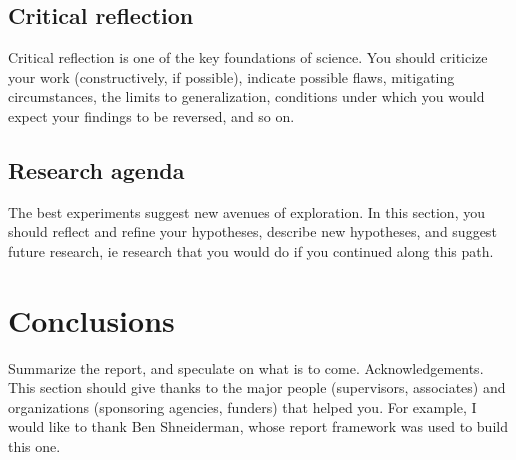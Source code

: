 \subsection{Critical reflection}
Critical reflection is one of the key foundations of science. You should criticize your work (constructively, if possible), indicate possible flaws, mitigating circumstances, the limits to generalization, conditions under which you would expect your findings to be reversed, and so on.
\subsection{Research agenda}
The best experiments suggest new avenues of exploration. In this section, you should reflect and refine your hypotheses, describe new hypotheses, and suggest future research, ie research that you would do if you continued along this path.
\section{Conclusions}
Summarize the report, and speculate on what is to come.
Acknowledgements. This section should give thanks to the major people (supervisors, associates) and organizations (sponsoring agencies, funders) that helped you. For example, I would like to thank Ben Shneiderman, whose report framework was used to build this one.